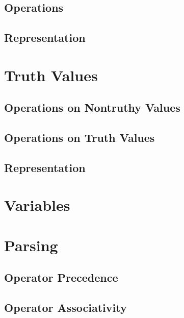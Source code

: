 \subsection{Operations}
\subsection{Representation}
\csharpsubsection{\csharp}

\section{Truth Values}


\subsection{Operations on Nontruthy Values}
\subsection{Operations on Truth Values}

\subsection{Representation}


\csharpsubsection{\csharp}

\section{Variables}
\csharpsubsection{\csharp}

\section{Parsing}
\subsection{Operator Precedence}
\subsection{Operator Associativity}

